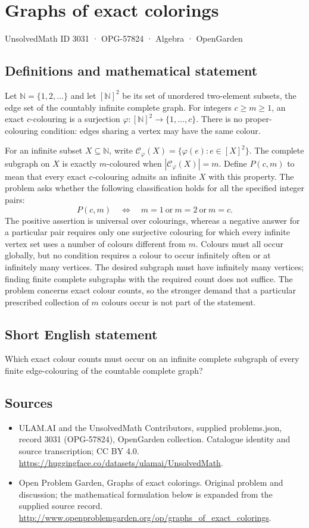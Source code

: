 \documentclass[11pt,a4paper]{article}
\begin{document}
\section*{Graphs of exact colorings}\label{3031}
{\small UnsolvedMath ID 3031 · OPG-57824 · Algebra · OpenGarden}
\subsection{Definitions and mathematical statement}
Let $\mathbb N=\{1,2,\ldots\}$ and let $[\mathbb N]^2$ be its set of unordered
two-element subsets, the edge set of the countably infinite complete graph.
For integers $c\ge m\ge1$, an exact $c$-colouring is a surjection
$\varphi:[\mathbb N]^2\to\{1,\ldots,c\}$. There is no proper-colouring
condition: edges sharing a vertex may have the same colour.

For an infinite subset $X\subseteq\mathbb N$, write
$\mathcal C_\varphi(X)=\{\varphi(e):e\in[X]^2\}$.
The complete subgraph on $X$ is exactly $m$-coloured when
$|\mathcal C_\varphi(X)|=m$. Define $P(c,m)$ to mean that every exact
$c$-colouring admits an infinite $X$ with this property.
The problem asks whether the following classification holds for all the
specified integer pairs:
\[
 P(c,m)\quad\Longleftrightarrow\quad
 m=1\ \text{or}\ m=2\ \text{or}\ m=c.
\]
The positive assertion is universal over colourings, whereas a negative
answer for a particular pair requires only one surjective colouring for
which every infinite vertex set uses a number of colours different from $m$.
Colours must all occur globally, but no condition requires a colour to occur
infinitely often or at infinitely many vertices. The desired subgraph must
have infinitely many vertices; finding finite complete subgraphs with the
required count does not suffice. The problem concerns exact colour counts,
so the stronger demand that a particular prescribed collection of $m$
colours occur is not part of the statement.
\subsection{Short English statement}
Which exact colour counts must occur on an infinite complete subgraph of every finite edge-colouring of the countable complete graph?
\subsection{Sources}
\begin{itemize}
\item[S1] ULAM.AI and the UnsolvedMath Contributors, supplied problems.json, record 3031 (OPG-57824), OpenGarden collection. Catalogue identity and source transcription; CC BY 4.0.
\url{https://huggingface.co/datasets/ulamai/UnsolvedMath}.
\item[S2] Open Problem Garden, Graphs of exact colorings. Original problem and discussion; the mathematical formulation below is expanded from the supplied source record.
\url{http://www.openproblemgarden.org/op/graphs_of_exact_colorings}.
\end{itemize}
\end{document}
